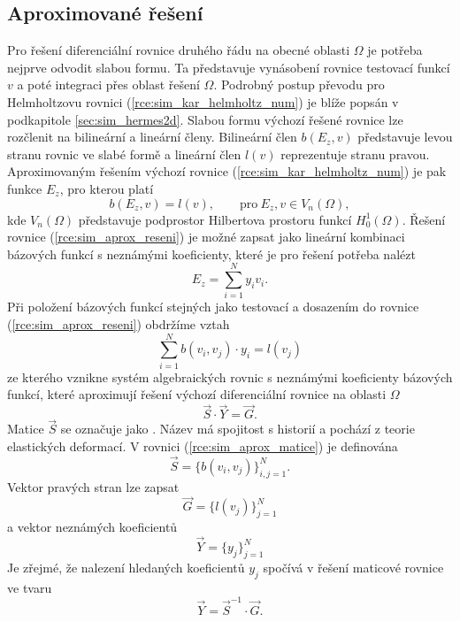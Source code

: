 \subsection*{Aproximované řešení}
Pro řešení diferenciální rovnice druhého řádu na obecné oblasti $\Omega$ je potřeba nejprve odvodit slabou formu. Ta představuje vynásobení rovnice testovací funkcí $v$ a poté integraci přes oblast řešení $\Omega$. Podrobný postup převodu pro Helmholtzovu rovnici (\ref{rce:sim_kar_helmholtz_num}) je blíže popsán v podkapitole \ref{sec:sim_hermes2d}. Slabou formu výchozí řešené rovnice lze rozčlenit na bilineární a lineární členy. Bilineární člen $b(E_z,v)$ představuje levou stranu rovnic ve slabé formě a lineární člen $l(v)$ reprezentuje stranu pravou.
Aproximovaným řešením výchozí rovnice (\ref{rce:sim_kar_helmholtz_num}) je pak funkce $E_z$, pro kterou platí 
\begin{equation}
	b(E_z,v) = l(v),\qquad \mathrm{pro}\ E_z, v \in V_{n}(\Omega),
	\label{rce:sim_aprox_reseni}
\end{equation}
kde $V_{n}(\Omega)$ představuje podprostor Hilbertova prostoru funkcí $H_{0}^{1}(\Omega)$. Řešení rovnice (\ref{rce:sim_aprox_reseni}) je možné zapsat jako lineární kombinaci bázových funkcí s neznámými koeficienty, které je pro řešení potřeba nalézt
\begin{displaymath}
	E_z = \sum_{i=1}^{N}y_i v_i.
\end{displaymath}
Při položení bázových funkcí stejných jako testovací a dosazením do rovnice  (\ref{rce:sim_aprox_reseni}) obdržíme vztah
\begin{equation}
	\sum_{i=1}^{N}b(v_i,v_j)\cdot y_i = l(v_j)
	\label{rce:sim_aprox_reseni2}
\end{equation}
ze kterého vznikne systém algebraických rovnic s neznámými koeficienty bázových funkcí, které aproximují řešení výchozí diferenciální rovnice na oblasti $\Omega$
\begin{equation}
	\vec S \cdot \vec Y = \vec G.
	\label{rce:sim_aprox_matice}
\end{equation}
Matice $\vec S$ se označuje jako . Název má spojitost s historií a pochází z teorie elastických deformací. V rovnici (\ref{rce:sim_aprox_matice}) je definována
\begin{displaymath}
	\vec S = \{b(v_i,v_j) \}_{i,j = 1}^{N}.
\end{displaymath}
Vektor pravých stran lze zapsat
\begin{displaymath}
	\vec G = \{l(v_j) \}_{j = 1}^{N}
\end{displaymath}
a vektor neznámých koeficientů
\begin{displaymath}
	\vec Y = \{y_j \}_{j = 1}^{N}
\end{displaymath}
Je zřejmé, že nalezení hledaných koeficientů $y_j$ spočívá v řešení maticové rovnice ve tvaru
\begin{equation}
	\vec Y = \vec S ^{-1}\cdot \vec G.
	\label{rce:sim_aprox_inv_matice}
\end{equation}


